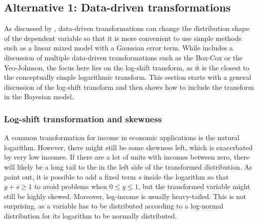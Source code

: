 \subsection{Alternative 1: Data-driven transformations}
\label{ch:log_shift}

As discussed by \cite{rojas_perilla_data_2020}, data-driven transformations can change the distribution shape of the dependent variable so that it is more convenient to use simple methods such as a linear mixed model with a Gaussian error term.
While \cite{rojas_perilla_data_2020} includes a discussion of multiple data-driven transformations such as the Box-Cox or the Yeo-Johnson, the focus here lies on the log-shift transform, as it is the closest to the conceptually simple logarithmic transform.
This section starts with a general discussion of the log-shift transform and then shows how to include the transform in the Bayesian model.

\subsubsection{Log-shift transformation and skewness}
A common transformation for income in economic applications is the natural logarithm. However, there might still be some skewness left, which is exacerbated by very low incomes.
If there are a lot of units with incomes between zero, there will likely be a long tail to the in the left side of the transformed distribution.
As \cite{rojas_perilla_data_2020} point out, it is possible to add a fixed term $s$ inside the logarithm so that $y+s \ge 1$ to avoid problems when $0 \le y \le 1$,
but the transformed variable might still be highly skewed.
Moreover, log-income is usually heavy-tailed.
This is not surprising, as a variable has to be distributed according to a log-normal distribution for its logarithm to be normally distributed.

